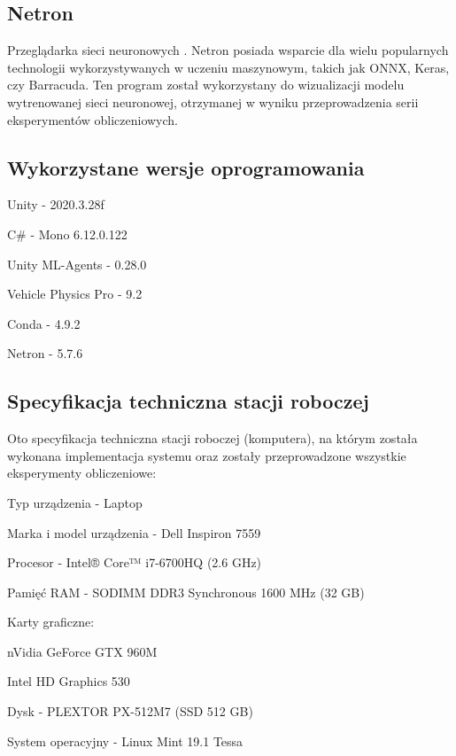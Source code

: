 \clearpage
\subsection{Netron}
\label{NetronOpis}
Przeglądarka sieci neuronowych \cite{netron:github}. Netron posiada wsparcie dla wielu popularnych technologii wykorzystywanych w uczeniu maszynowym, takich jak ONNX, Keras, czy Barracuda. Ten program został wykorzystany do wizualizacji modelu wytrenowanej sieci neuronowej, otrzymanej w wyniku przeprowadzenia serii eksperymentów obliczeniowych.

\vspace{0.5cm}

\subsection{Wykorzystane wersje oprogramowania}
\begin{enumerate*}
\item Unity - 2020.3.28f
\item C\# - Mono 6.12.0.122
\item Unity ML-Agents - 0.28.0
\item Vehicle Physics Pro - 9.2
\item Conda - 4.9.2
\item Netron - 5.7.6
\end{enumerate*}

\vspace{0.5cm}

\subsection{Specyfikacja techniczna stacji roboczej}
\label{ComputerTechSpecs}
Oto specyfikacja techniczna stacji roboczej (komputera), na którym została wykonana implementacja systemu oraz zostały przeprowadzone wszystkie eksperymenty obliczeniowe:
\begin{enumerate*}
\item Typ urządzenia - Laptop
\item Marka i model urządzenia - Dell Inspiron 7559 \cite{dellInspiron:specs}
\item Procesor - Intel® Core™ i7-6700HQ (2.6 GHz) \cite{intelCpu:specs}
\item Pamięć RAM - SODIMM DDR3 Synchronous 1600 MHz (32 GB)
\item Karty graficzne:
\begin{itemize*}
\item nVidia GeForce GTX 960M \cite{nvidiaGPU:specs}
\item Intel HD Graphics 530
\end{itemize*}
\item Dysk - PLEXTOR PX-512M7 (SSD 512 GB)
\item System operacyjny - Linux Mint 19.1 Tessa
\end{enumerate*}